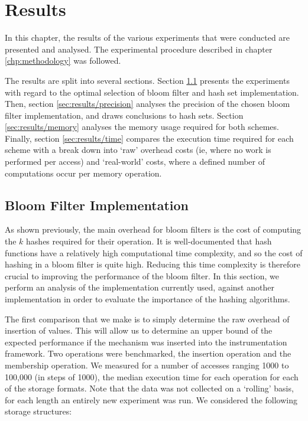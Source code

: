 \chapter{Results} \label{chp:results}
In this chapter, the results of the various experiments that were conducted are presented and analysed. The experimental procedure described in chapter \ref{chp:methodology} was followed.

The results are split into several sections. Section \ref{sec:results/bfimpl} presents the experiments with regard to the optimal selection of bloom filter and hash set implementation. Then, section \ref{sec:results/precision} analyses the precision of the chosen bloom filter implementation, and draws conclusions to hash sets. Section \ref{sec:results/memory} analyses the memory usage required for both schemes. Finally, section \ref{sec:results/time} compares the execution time required for each scheme with a break down into `raw' overhead costs (ie, where no work is performed per access) and `real-world' costs, where a defined number of computations occur per memory operation.

\section{Bloom Filter Implementation} \label{sec:results/bfimpl}
As shown previously, the main overhead for bloom filters is the cost of computing the $k$ hashes required for their operation. It is well-documented that hash functions have a relatively high computational time complexity, and so the cost of hashing in a bloom filter is quite high. Reducing this time complexity is therefore crucial to improving the performance of the bloom filter. In this section, we perform an analysis of the implementation currently used, against another implementation in order to evaluate the importance of the hashing algorithms.

The first comparison that we make is to simply determine the raw overhead of insertion of values. This will allow us to determine an upper bound of the expected performance if the mechanism was inserted into the instrumentation framework. Two operations were benchmarked, the insertion operation and the membership operation. We measured for a number of accesses ranging 1000 to 100,000 (in steps of 1000), the median execution time for each operation for each of the storage formats. Note that the data was not collected on a `rolling' basis, for each length an entirely new experiment was run. We considered the following storage structures:

